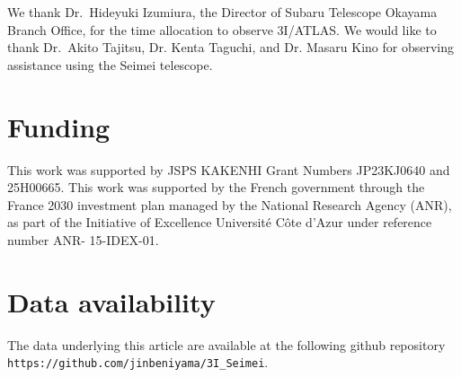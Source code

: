 \documentclass[]{pasj02}
\begin{document}
\begin{ack}
We thank Dr.~Hideyuki Izumiura, the Director of Subaru Telescope Okayama Branch Office, 
for the time allocation to observe 3I/ATLAS.
We would like to thank Dr.~Akito Tajitsu, Dr. Kenta Taguchi, and Dr. Masaru Kino 
for observing assistance using the Seimei telescope.
\end{ack}

\section*{Funding}
This work was supported by JSPS KAKENHI Grant Numbers JP23KJ0640 and 25H00665. 
This work was supported by the French government through the France 2030 
investment plan managed by the National Research Agency (ANR), as part of the
Initiative of Excellence Université Côte d’Azur under reference number ANR- 15-IDEX-01.

\section*{Data availability} 
The data underlying this article are available at the following 
github repository \texttt{https://github.com/jinbeniyama/3I\_Seimei}.




\end{document}
